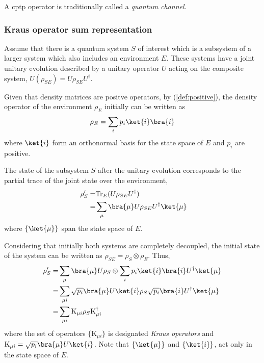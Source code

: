 \begin{definition}
  A \acrfull{cptp} operator is traditionally called a \emph{quantum channel}.
\end{definition}



\subsubsection{Kraus operator sum representation}


Assume that there is a quantum system $S$ of interest which is a subsystem of a larger system which also includes an environment $E$. These systems have a joint unitary evolution described by a unitary operator $U$ acting on the composite system, $U (\rho_{SE} )= U \rho_{SE} U^{\dag}$. 

Given that density matrices are positve operators, by (\autoref{def:positive}), the density operator of the environment $\rho_E$ initially can be written as 
\begin{equation*}
  \rho_E = \sum_{i} p_{i} \ket{i} \bra{i}
\end{equation*}
where $\ket{i}$ form an orthonormal basis for the state space of $E$ and $p_{i}$ are positive. 

The state of the subsystem $S$ after the unitary evolution corresponds to the partial trace of the joint state over the environment,
\begin{align*}
  \rho_{S}' = & \text{Tr}_{E}(U \rho_{SE} U^{\dag}) \\
 = & \sum_{\mu} \bra{\mu} U \rho_{SE} U^{\dag} \ket{\mu}
\end{align*}
where $\{\ket{\mu}\}$ span the state space of $E$.

 
Considering that initially both systems are completely decoupled, the initial state of the system can be written as $ \rho_{SE} = \rho_{S} \otimes \rho_{E}$. Thus,
\begin{align*} 
  \rho_{S}' = & \sum_{\mu} \bra{\mu} U \rho_{S} \otimes \sum_{i} p_{i} \ket{i} \bra{i} U^{\dag} \ket{\mu} \\
  = & \sum_{\mu i}  \sqrt{p_{i}} \bra{\mu} U \ket{i} \rho_{S} \sqrt{p_{i}} \bra{i} U^{\dag} \ket{\mu}  \\ 
  = & \sum_{\mu i} \text{K}_{\mu i} \rho_{S} \text{K}_{\mu i}^{\dag}
\end{align*}
where the set of operators $\{\text{K}_{\mu i}\}$ is designated \emph{Kraus operators} and $\text{K}_{\mu i} = \sqrt{p_{i}} \bra{\mu} U \ket{i}$. Note that $\{\ket{\mu}\}$ and $\{\ket{i}\}$, act only in the state space of $E$. 

